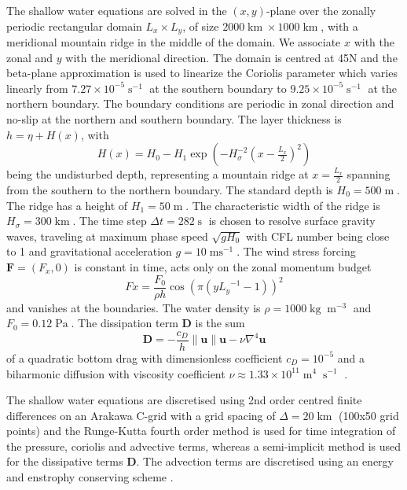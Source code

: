 \documentclass[draft]{agujournal2019}
\newcommand{\op}{\operatorname}
\begin{document}
The shallow water equations are solved in the $(x,y)$-plane over the zonally periodic rectangular domain $L_x \times L_y$, of size $2000\op{km} \times 1000\op{km}$, with a meridional mountain ridge in the middle of the domain. We associate $x$ with the zonal and $y$ with the meridional direction. The domain is centred at 45N and the beta-plane approximation \cite{Vallis2006} is used to linearize the Coriolis parameter which varies linearly from $7.27 \times 10^{-5}\op{s}^{-1}$ at the southern boundary to $9.25 \times 10^{-5}\op{s}^{-1}$ at the northern boundary. The boundary conditions are periodic in zonal direction and no-slip at the northern and southern boundary. The layer thickness is $h = \eta + H(x)$, with
\begin{equation}
H(x) = H_0 - H_1\exp\left(-H_\sigma^{-2}(x-\tfrac{L_x}{2})^2\right)
\end{equation}
being the undisturbed depth, representing a mountain ridge at $x=\tfrac{L_x}{2}$ spanning from the southern to the northern boundary. The standard depth is $H_0 = 500\op{m}$. The ridge has a height of $H_1 = 50\op{m}$. The characteristic width of the ridge is $H_\sigma = 300\op{km}$. The time step $\Delta t = 282\op{s}$ is chosen to resolve surface gravity waves, traveling at maximum phase speed $\sqrt{gH_0}$ with CFL number being close to 1 and gravitational acceleration $g=10\op{ms}^{-1}$. The wind stress forcing $\mathbf{F} = (F_x,0)$ is constant in time, acts only on the zonal momentum budget
\begin{equation}
Fx = \frac{F_0}{\rho h} \cos\left(\pi\left(y{L_y}^{-1} - 1\right)\right)^2
\end{equation}
and vanishes at the boundaries. The water density is $\rho = 1000\op{kg}\op{m}^{-3}$ and $F_0 = 0.12\op{Pa}$. The dissipation term $\mathbf{D}$ is the sum 
\begin{equation}
\mathbf{D} = -\frac{c_D}{h}\| \mathbf{u} \| \mathbf{u} - \nu \nabla^4 \mathbf{u}
\label{eq:diss}
\end{equation}
of a quadratic bottom drag with dimensionless coefficient $c_D = 10^{-5}$ \cite{Arbic2008} and a biharmonic diffusion with viscosity coefficient $\nu \approx 1.33\times10^{11} \op{m}^4\op{s}^{-1}$ \cite{Griffies2000}. 

The shallow water equations are discretised using 2nd order centred finite differences on an Arakawa C-grid \cite{Arakawa1977} with a grid spacing of $\Delta = 20\operatorname{km}$ (100x50 grid points) and the Runge-Kutta fourth order method \cite{Butcher2016} is used for time integration of the pressure, coriolis and advective terms, whereas a semi-implicit method is used for the dissipative terms $\mathbf{D}$. The advection terms are discretised using an energy and enstrophy conserving scheme \cite{Arakawa1990}. 
\end{document}
